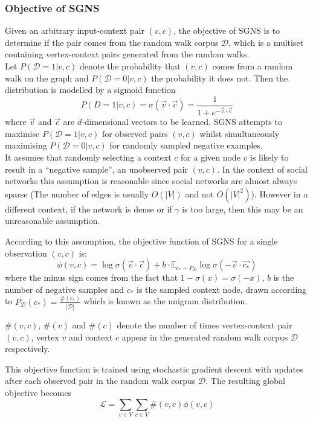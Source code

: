 \documentclass[a4paper]{article}
\renewcommand{\E}{\mathbb E}
\newcommand{\D}{\mathcal D}
\begin{document}
\subsubsection{Objective of SGNS}
Given an arbitrary input-context pair $(v,c)$, the objective of SGNS is to determine if
the pair comes from the random walk corpus $\mathcal{D}$, which is a multiset containing vertex-context pairs generated from the random walks.\\
Let $P(\D = 1 | v, c)$ denote the probability that $(v,c)$ comes from a random
walk on the graph and $P(\D = 0| v, c)$
the probability it does not. Then the distribution is modelled by a sigmoid
function
\[P(D = 1 | v, c) = \sigma(\vec{v} \cdot \vec{c}) = \frac{1}{1 + e^{-\vec{v} \cdot \vec{c}}}\]
where $\vec{v}$ and $\vec{c}$ are $d$-dimensional vectors to be learned. SGNS attempts to maximise $P(\mathcal{D} = 1 | v,c)$ for observed pairs $(v, c)$
whilst simultaneously maximising $P(\D = 0 | v, c)$ for randomly sampled
negative examples.\\
It assumes that randomly selecting a context $c$ for a given
node $v$ is likely to result in a ``negative sample'', an unobserved pair $(v,c)$. In the context of
social networks this assumption is reasonable since social networks are almost
always sparse (The number of edges is usually $O(|V|)$ and not $O(|V|^2)$). However in a different
context, if the network is dense or if $\gamma$ is too large, then this may be an unreasonable assumption.

According to this assumption, the objective function of SGNS for a single
observation $(v,c)$ is:
\begin{equation}
\phi(v, c) = \log{\sigma(\vec{v} \cdot \vec{c})} + b \cdot \E_{c_* \sim P_D}\log{\sigma(-\vec{v} \cdot \vec{c_*})}
\end{equation}
where the minus sign comes from the fact that $1 - \sigma(x) = \sigma(-x)$, $b$
is the number of negative samples and $c_*$ is the sampled context node, drawn
according to $P_{\D} (c_*) = \frac{\#(c_*)}{| \D |}$ which is known as the unigram
distribution.\\
\begin{notation} $\#(v,c)$, $\#(v)$ and $\#(c)$ denote the number of times vertex-context pair
  $(v,c)$, vertex $v$ and context $c$ appear in the generated random walk corpus
  $\mathcal{D}$ respectively.
\end{notation}
\noindent This objective function is trained using stochastic gradient descent with
updates after each  observed pair in the random walk corpus $\D$. The resulting
global objective becomes
\begin{equation*}
  \mathcal{L} = \sum_{v \in V} \sum_{c \in V} \#(v,c)\phi(v, c)
\end{equation*}
\end{document}
